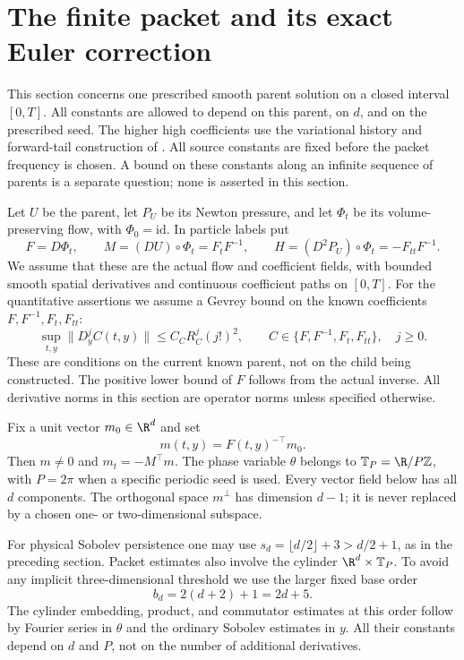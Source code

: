 \section{The finite packet and its exact Euler correction}\label{sec:exact-packet}

This section concerns one prescribed smooth parent solution on a closed
interval $[0,T]$. All constants are allowed to depend on this parent, on $d$,
and on the prescribed seed. The higher high coefficients use the
variational history and forward-tail construction of \cite[\S3]{OAI}.
All source constants are fixed before the packet frequency is
chosen. A bound on these constants along an infinite sequence of parents is
a separate question; none is asserted in this section.

Let $U$ be the parent, let $P_U$ be its Newton pressure, and let $\Phi_t$ be
its volume-preserving flow, with $\Phi_0=\mathrm{id}$. In particle labels put
\begin{equation}\label{eq:packet-frame}
 F=D\Phi_t,\qquad M=(DU)\circ\Phi_t=F_tF^{-1},\qquad
 H=(D^2P_U)\circ\Phi_t=-F_{tt}F^{-1}.
\end{equation}
We assume that these are the actual flow and coefficient fields, with bounded
smooth spatial derivatives and continuous coefficient paths on $[0,T]$.
For the quantitative assertions we assume a Gevrey bound on the known
coefficients $F,F^{-1},F_t,F_{tt}$:
\begin{equation}\label{eq:packet-known-jets}
 \sup_{t,y}\|D_y^j C(t,y)\|\le C_C R_C^j(j!)^2,
 \qquad C\in\{F,F^{-1},F_t,F_{tt}\},\quad j\ge0.
\end{equation}
These are conditions on the current known parent, not on the child being
constructed. The positive lower bound of $F$ follows from the actual inverse.
All derivative norms in this section are operator norms unless specified
otherwise.

Fix a unit vector $m_0\in\R^d$ and set
\[
 m(t,y)=F(t,y)^{-\top}m_0.
\]
Then $m\ne0$ and $m_t=-M^{\top}m$. The phase variable $\theta$ belongs
to $\mathbb T_P=\R/P\mathbb Z$, with $P=2\pi$ when a specific periodic seed
is used. Every vector field below has all $d$ components. The orthogonal
space $m^\perp$ has dimension $d-1$; it is never replaced by a chosen
one- or two-dimensional subspace.

For physical Sobolev persistence one may use
$s_d=\lfloor d/2\rfloor+3>d/2+1$, as in the preceding section. Packet
estimates also involve the cylinder $\R^d\times\mathbb T_P$. To avoid any
implicit three-dimensional threshold we use the larger fixed base order
\begin{equation}\label{eq:packet-base-index}
 b_d=2(d+2)+1=2d+5.
\end{equation}
The cylinder embedding, product, and commutator estimates at this order
follow by Fourier series in $\theta$ and the ordinary Sobolev estimates in
$y$. All their constants depend on $d$ and $P$, not on the number of
additional derivatives.

